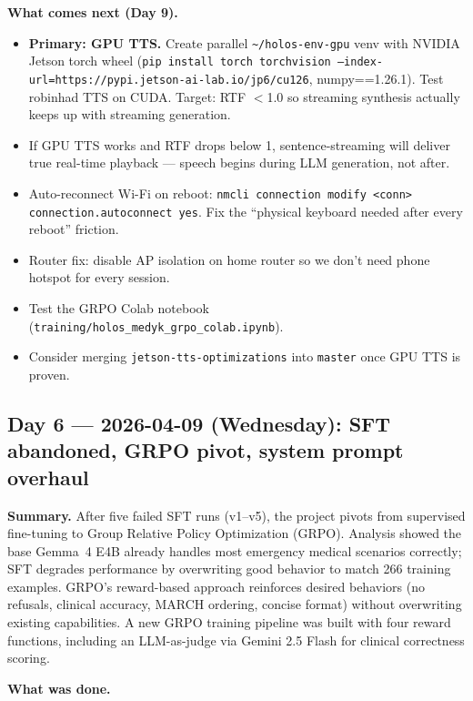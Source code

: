 \documentclass{article}
\theoremstyle{plain}
\theoremstyle{definition}
\theoremstyle{remark}
\begin{document}
\textbf{What comes next (Day 9).}
\begin{itemize}
\item \textbf{Primary: GPU TTS.} Create parallel \texttt{\~{}/holos-env-gpu} venv with NVIDIA Jetson torch wheel (\texttt{pip install torch torchvision --index-url=https://pypi.jetson-ai-lab.io/jp6/cu126}, numpy==1.26.1). Test robinhad TTS on CUDA. Target: RTF $<$1.0 so streaming synthesis actually keeps up with streaming generation.
\item If GPU TTS works and RTF drops below 1, sentence-streaming will deliver true real-time playback --- speech begins during LLM generation, not after.
\item Auto-reconnect Wi-Fi on reboot: \texttt{nmcli connection modify <conn> connection.autoconnect yes}. Fix the ``physical keyboard needed after every reboot'' friction.
\item Router fix: disable AP isolation on home router so we don't need phone hotspot for every session.
\item Test the GRPO Colab notebook (\texttt{training/holos\_medyk\_grpo\_colab.ipynb}).
\item Consider merging \texttt{jetson-tts-optimizations} into \texttt{master} once GPU TTS is proven.
\end{itemize}

\subsection*{Day 6 --- 2026-04-09 (Wednesday): SFT abandoned, GRPO pivot, system prompt overhaul}

\textbf{Summary.} After five failed SFT runs (v1--v5), the project pivots from supervised fine-tuning to Group Relative Policy Optimization (GRPO). Analysis showed the base Gemma~4 E4B already handles most emergency medical scenarios correctly; SFT degrades performance by overwriting good behavior to match 266 training examples. GRPO's reward-based approach reinforces desired behaviors (no refusals, clinical accuracy, MARCH ordering, concise format) without overwriting existing capabilities. A new GRPO training pipeline was built with four reward functions, including an LLM-as-judge via Gemini 2.5 Flash for clinical correctness scoring.

\textbf{What was done.}
\end{document}
